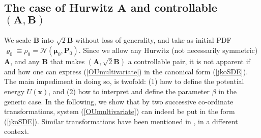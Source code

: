 \documentclass[letterpaper,10pt,twocolumn,conference]{ieeeconf}
\newcommand{\bbmu}{\bm{\mu}}
\newcommand{\bbP}{\bm{P}}
\newcommand{\bbA}{\bm{A}}
\newcommand{\bbB}{\bm{B}}
\begin{document}

\subsection{The case of Hurwitz $\bbA$ and controllable $(\bbA,\bbB)$}\label{GenericCaseSubsectonLabel}
We scale $\bbB$ into $\sqrt{2}\bbB$ without loss of generality, and  take as initial PDF $\varrho_{0}\equiv\rho_{0} = \mathcal{N}(\bbmu_{0},\bbP_{0})$. Since we allow any Hurwitz (not necessarily symmetric) $\bbA$, and any $\bbB$ that makes $(\bbA,\sqrt{2}\bbB)$ a controllable pair, it is not apparent if and how one can express (\ref{OUmultivariate}) in the canonical form (\ref{jkoSDE}). The main impediment in doing so, is twofold: (1) how to define the potential energy $U(\bm{x})$, and (2) how to interpret and define the parameter $\beta$ in the generic case. In the following, we show that by two successive co-ordinate transformations, system (\ref{OUmultivariate}) can indeed be put in the form (\ref{jkoSDE}). Similar transformations have been mentioned in \cite[p. 1464]{LiberzonBrockettSIAM2000}, \cite{BrockettWillemsCDC1978} in a different context.
\end{document}
